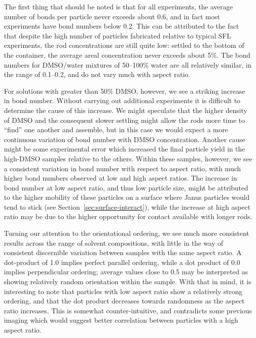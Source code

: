 The first thing that should be noted is that for all experiments, the average number of bonds per
particle never exceeds about 0.6, and in fact most experiments have bond numbers below 0.2.  This
can be attributed to the fact that despite the high number of particles fabricated relative to
typical SFL experiments, the rod concentrations are still quite low: settled to the bottom of the
container, the average areal concentration never exceeds about 5\%.  The bond numbers for 
DMSO/water mixtures of 50--100\% water are all relatively similar, in the range of 0.1--0.2, and do
not vary much with aspect ratio.  

For solutions with greater than 
50\% DMSO, however, we see a striking increase in bond number.  Without carrying out additional experiments it 
is difficult to determine the cause of this increase. We might speculate that the higher density of DMSO
and the consequent slower settling might allow the rods more time to ``find'' one another and assemble, but in
this case we would expect a more continuous variation of bond number with DMSO concentration. Another cause might
be some experimental error which increased the final particle yield in the high-DMSO samples relative to the others.
Within these samples, however, we see a consistent variation in bond number with respect to aspect ratio, with
much higher bond numbers observed at low and high aspect ratios.  The increase in bond number at low aspect ratio, 
and thus low particle size, might be attributed to the higher mobility of these particles on a surface where
Janus particles would tend to stick (see Section~\ref{sec:surface-interact}), while the increase at high aspect
ratio may be due to the higher opportunity for contact available with longer rods.

Turning our attention to the orientational ordering, we see much more consistent results across the
range of solvent compositions, with little in the way of consistent discernible variation between samples with
the same aspect ratio.  A dot-product of 1.0 implies perfect parallel ordering, while a dot product of 0.0 implies
perpendicular ordering; average values close to 0.5 may be interpreted as showing relatively random orientation
within the sample.  With that in mind, it is interesting to note that particles with low aspect ratio show 
a relatively strong ordering, and that the dot product decreases towards randomness as the aspect ratio 
increases.  This is somewhat counter-intuitive, and contradicts some previous imaging which would suggest
better correlation between particles with a high aspect ratio.

